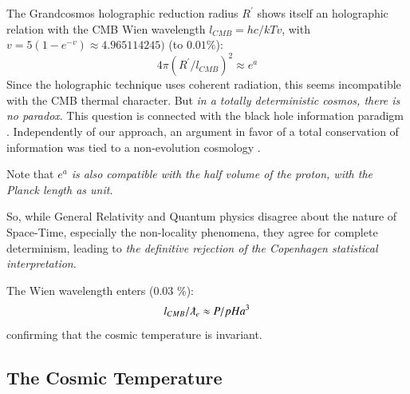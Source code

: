 \documentclass[twoside,draft]{article}
\begin{document}
\begin{sloppypar}
The Grandcosmos holographic reduction radius $R^{\prime}$ shows itself an holographic
relation with the CMB Wien wavelength $l_{CMB} = hc/kTv $, with $v = 5 (1-e^{-v}) \approx 4.965114245)$ (to $0.01\%$):
\begin{equation}
4\pi(R^{\prime}/l_{CMB})^{2} \approx e^{a}
\end{equation}
Since the holographic technique uses coherent radiation, this seems incompatible with the CMB
thermal character. But \textit{in a totally deterministic cosmos, there is no paradox}. This question is
connected with the black hole information paradigm \cite{Preskill}. Independently of our approach, an
argument in favor of a total conservation of information was tied to a non-evolution cosmology
\cite{Nikolic}. 

Note that \textit{$e^{a}$ is also compatible with the half volume of the proton, with
the Planck length as unit}.

So, while General Relativity and Quantum physics disagree about the nature of Space-Time, especially the non-locality phenomena, they agree for complete determinism, leading to \textit{the definitive rejection of the
Copenhagen statistical interpretation}. 

The Wien wavelength enters (0.03 \%):
\begin{equation}
l_{CMB} / \lambdabar_e \approx P/pH a^3
\end{equation}
confirming that the cosmic temperature is invariant. 

\subsection{The Cosmic Temperature}


\end{sloppypar}
\end{document}
